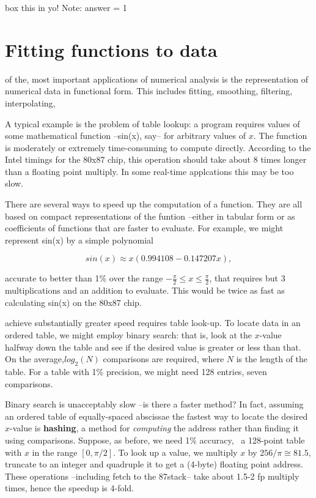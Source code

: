 box this in yo!
Note:
    answer = 1

\section{Fitting functions to data}
 of the, most important applications of numerical analysis is the representation of numerical data in functional form. This includes fitting, smoothing, filtering, interpolating, \etc

A typical example is the problem of table lookup: a program requires values of some mathematical function --sin(x), say-- for arbitrary values of $x$. The function is moderately or extremely time-consuming to compute directly. According to the Intel timings for the 80x87 chip, this operation should take about 8 times longer than a floating point multiply. In some real-time applcations this may be too slow.

There are several ways to speed up the computation of a function. They are all based on compact representations of the funtion --either in tabular form or as coefficients of functions that are faster to evaluate. For example, we might represent sin(x) by a simple polynomial

\begin{equation}
sin(x) \approx x \left( 0.994108 - 0.147207x\right),
\end{equation}

accurate to better than 1\% over the range $-\frac{\pi}{2}\leq x \leq \frac{\pi}{2}$, that requires but 3 multiplications and an addition to evaluate. This would be twice as fast as calculating sin(x) on the 80x87 chip.

 achieve substantially greater speed requires table look-up. To locate data in an ordered table, we might employ binary search: that is, look at the $x$-value halfway down the table and see if the desired value is greater or less than that. On the average,$log_{2}(N)$ comparisons are required, where $N$ is the length of the table. For a table with 1\% precision, we might need 128 entries, \ie seven comparisons.

Binary search is unacceptably slow --is there a faster method? In fact, assuming an ordered table of equally-spaced abscissae the fastest way to locate the desired $x$-value is \textbf{hashing}, a method for \textit{computing} the address rather than finding it using comparisons. Suppose, as before, we need 1\% accuracy, \ie\ a 128-point table with $x$ in the range $[0,\pi/2]$. To look up a value, we multiply $x$ by $256/\pi \cong 81.5$, truncate to an integer and quadruple it to get a (4-byte) floating point address. These operations --including fetch to the 87stack-- take about 1.5-2 fp multiply times, hence the speedup is 4-fold.

